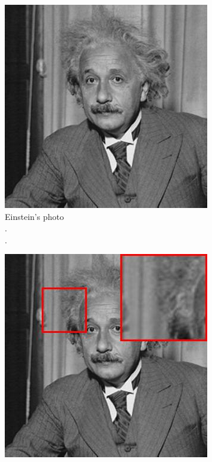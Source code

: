 \begin{figure}
     \centering
     \begin{subfigure}[b]{0.3\textwidth}
         \centering
         \includegraphics[width=\textwidth]{./figs/image003}
         \caption{Einstein's photo\\.\\.}
         \label{fig:einstein-orig}
     \end{subfigure}
     \hfill
     \begin{subfigure}[b]{0.3\textwidth}
         \centering
         \includegraphics[width=\textwidth]{./figs/image003_bn}

\end{subfigure}
\end{figure}
